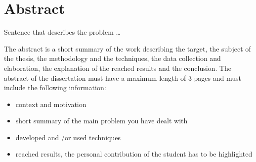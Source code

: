\chapter*{Abstract} %
\label{abstract}

\vspace{0.5 cm} 

Sentence that describes the problem \dots

	The abstract is a short summary of the work describing the target, the subject of the thesis, the methodology 
and the techniques, the data collection and elaboration, the explanation of the reached results and the conclusion.
The abstract of the dissertation must have a maximum length of 3 pages and must include the following information: 

\begin{itemize}
  \item context and motivation
  \item short summary of the main problem you have dealt with
  \item developed and /or used techniques
  \item reached results, the personal contribution of the student has to be highlighted
\end{itemize}
